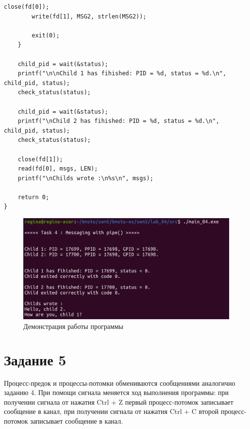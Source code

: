 \begin{center}
\begin{lstlisting}[label=lst:pipe,caption=Системный вызов pipe()]
        close(fd[0]);
        write(fd[1], MSG2, strlen(MSG2));

        exit(0);
    }

    child_pid = wait(&status);
    printf("\n\nChild 1 has fihished: PID = %d, status = %d.\n", child_pid, status);
    check_status(status);

    child_pid = wait(&status);
    printf("\nChild 2 has fihished: PID = %d, status = %d.\n", child_pid, status);
    check_status(status);

    close(fd[1]);
    read(fd[0], msgs, LEN);
    printf("\nChilds wrote :\n%s\n", msgs);

    return 0;
}
\end{lstlisting}
\end{center}

\begin{figure}[H]
	\begin{center}
		\includegraphics[scale=0.3]{inc/pipe.png}
	\end{center}
	\captionsetup{justification=centering}
	\caption{Демонстрация работы программы}
	\label{img:pipe}
\end{figure}

\section*{Задание 5}

Процесс-предок и процессы-потомки обмениваются сообщениями аналогично заданию 4. При помощи сигнала меняется ход выполнения программы: при получении сигнала от нажатия Ctrl + Z первый процесс-потомок записывает сообщение в канал, при получении сигнала от нажатия Ctrl + C второй процесс-потомок записывает сообщение в канал.

